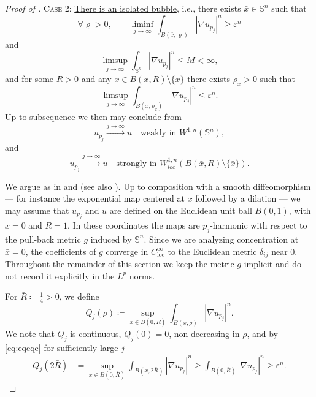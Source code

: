 \documentclass[12pt]{amsart}
\def\eps{\varepsilon}
\def\S{{\mathbb S}}
\numberwithin{theorem}{section} \numberwithin{equation}{section}
\begin{document}
\begin{proof}[Proof of ]
\textsc{Case 2}: \underline{There is an isolated bubble}, i.e., 
there exists $\bar{x} \in \S^n$ such that 
\begin{equation}\label{eq:eqeqe}
 \forall \varrho>0, \qquad \liminf_{j\to \infty} \int_{B(\bar{x},\varrho)} |\nabla u_{p_j}|^n \ge \eps^n
\end{equation}
and 
\begin{equation}\label{eq:eqeqebdd}
 \limsup_{j\to \infty} \int_{\S^n} |\nabla u_{p_j}|^n \leq M < \infty,
\end{equation}
and for some $R > 0$ and any $x \in \overline{B(\bar{x},R)} \setminus \{\bar{x}\}$ there exists $\rho_x > 0$ such that 
\begin{equation}\label{eq:eqeqebddv2}
 \limsup_{j\to \infty} \int_{B(x,\rho_x)} |\nabla u_{p_j}|^n \leq \eps^n  .
\end{equation}
Up to subsequence we then may conclude from 
\begin{equation}\label{eq:limitingmap}
 u_{p_j} \xrightarrow{j \to \infty} u \quad \text{weakly in $W^{1,n}(\S^n)$},
\end{equation} 
and
\begin{equation}\label{eq:limitingmapstrong}
 u_{p_j} \xrightarrow{j \to \infty} u \quad \text{strongly in $W^{1,n}_{loc}\left(B(\bar{x},R) \setminus \{\bar{x}\}\right)$}.
\end{equation}

We argue as in \cite[Proof of Lemma~1]{Brezis_Coron_1985} and \cite[Section~5.2]{MMR} (see also \cite{Mou-Wang}).
Up to composition with a smooth diffeomorphism --- for instance the exponential map centered at $\bar x$ followed by a dilation --- we may assume that $u_{p_j}$ and $u$ are defined on the Euclidean unit ball $B(0,1)$, with $\bar x=0$ and $R=1$.
In these coordinates the maps are $p_j$-harmonic with respect to the pull-back metric $g$ induced by $\mathbb S^n$.
Since we are analyzing concentration at $\bar x=0$, the coefficients of $g$ converge in $C^\infty_{\mathrm{loc}}$ to the Euclidean metric $\delta_{ij}$ near $0$.
Throughout the remainder of this section we keep the metric $g$ implicit and do not record it explicitly in the $L^p$ norms.


For $\bar{R} \coloneqq \frac{1}{4} >0$, we define 
\[
 Q_j(\rho) \coloneqq \sup_{x\in B(0,\bar{R})} \int_{B (x,\rho)} |\nabla u_{p_j}|^{n}.
\]
We note that $Q_j$ is continuous, $Q_j(0)=0$, non-decreasing in $\rho$, and by \eqref{eq:eqeqe} for sufficiently large $j$
\[
\begin{split}
 Q_j(2\bar{R}) &= \sup_{x\in B  (0,\bar{R})}\int_{B (x,2\bar{R})} |\nabla u_{p_j}|^{n} \ge \int_{B (0,\bar{R})}|\nabla u_{p_j}|^{n}\ge \eps^{n}.
\end{split}
 \]


\end{proof}
\end{document}
